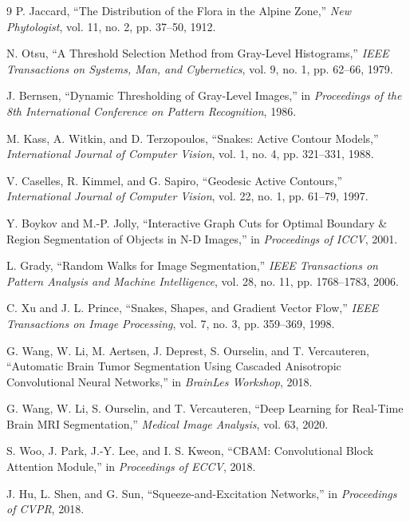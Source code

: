 \documentclass[12pt,a4paper]{article}
\begin{document}
\begin{thebibliography}{9}
P. Jaccard, ``The Distribution of the Flora in the Alpine Zone,'' \textit{New Phytologist}, vol. 11, no. 2, pp. 37--50, 1912.

N. Otsu, ``A Threshold Selection Method from Gray-Level Histograms,'' \textit{IEEE Transactions on Systems, Man, and Cybernetics}, vol. 9, no. 1, pp. 62--66, 1979.

J. Bernsen, ``Dynamic Thresholding of Gray-Level Images,'' in \textit{Proceedings of the 8th International Conference on Pattern Recognition}, 1986.

M. Kass, A. Witkin, and D. Terzopoulos, ``Snakes: Active Contour Models,'' \textit{International Journal of Computer Vision}, vol. 1, no. 4, pp. 321--331, 1988.

V. Caselles, R. Kimmel, and G. Sapiro, ``Geodesic Active Contours,'' \textit{International Journal of Computer Vision}, vol. 22, no. 1, pp. 61--79, 1997.

Y. Boykov and M.-P. Jolly, ``Interactive Graph Cuts for Optimal Boundary \& Region Segmentation of Objects in N-D Images,'' in \textit{Proceedings of ICCV}, 2001.

L. Grady, ``Random Walks for Image Segmentation,'' \textit{IEEE Transactions on Pattern Analysis and Machine Intelligence}, vol. 28, no. 11, pp. 1768--1783, 2006.

C. Xu and J. L. Prince, ``Snakes, Shapes, and Gradient Vector Flow,'' \textit{IEEE Transactions on Image Processing}, vol. 7, no. 3, pp. 359--369, 1998.

G. Wang, W. Li, M. Aertsen, J. Deprest, S. Ourselin, and T. Vercauteren, ``Automatic Brain Tumor Segmentation Using Cascaded Anisotropic Convolutional Neural Networks,'' in \textit{BrainLes Workshop}, 2018.

G. Wang, W. Li, S. Ourselin, and T. Vercauteren, ``Deep Learning for Real-Time Brain MRI Segmentation,'' \textit{Medical Image Analysis}, vol. 63, 2020.

S. Woo, J. Park, J.-Y. Lee, and I. S. Kweon, ``CBAM: Convolutional Block Attention Module,'' in \textit{Proceedings of ECCV}, 2018.

J. Hu, L. Shen, and G. Sun, ``Squeeze-and-Excitation Networks,'' in \textit{Proceedings of CVPR}, 2018.

\end{thebibliography}
\end{document}
